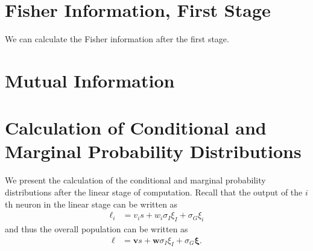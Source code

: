 \documentclass[11pt]{article}
\begin{document}
	\section{Fisher Information, First Stage}
	We can calculate the Fisher information after the first stage. 
	
	\section{Mutual Information}
	
	
	\appendix
	\newpage
	\section{Calculation of Conditional and Marginal Probability Distributions}
	We present the calculation of the conditional and marginal probability distributions after the linear stage of computation. Recall that the output of the $i$th neuron in the linear stage can be written as
	\begin{align}
		\ell_i &= v_i s + w_i \sigma_I \xi_I + \sigma_G\xi_i
	\end{align}
	and thus the overall population can be written as 
	\begin{align}
		\boldsymbol{\ell} &= \mathbf{v} s + \mathbf{w} \sigma_I \xi_I + \sigma_G \boldsymbol{\xi}.
	\end{align}
	
\end{document}
